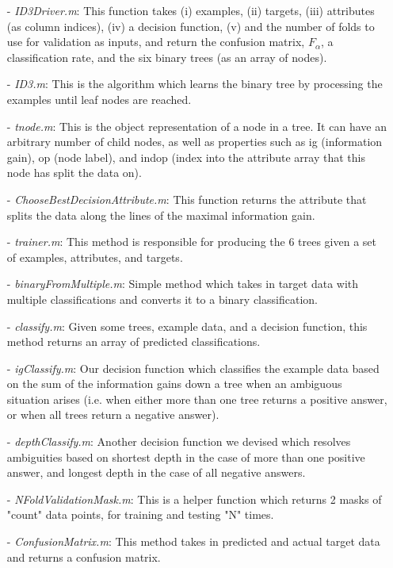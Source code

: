 \documentclass[11pt]{amsart}
\begin{document}
\begin{itemize}
\item[-] \emph{ID3Driver.m}: This function takes (i) examples, (ii) targets, (iii) attributes (as column indices), (iv) a decision function, (v) and the number of folds to use for validation as inputs, and return the confusion matrix, $F_{\alpha}$, a classification rate, and the six binary trees (as an array of nodes).
\item[-] \emph{ID3.m}: This is the algorithm which learns the binary tree by processing the examples until leaf nodes are reached.
\item[-] \emph{tnode.m}: This is the object representation of a node in a tree.  It can have an arbitrary number of child nodes, as well as properties such as ig (information gain), op (node label), and indop (index into the attribute array that this node has split the data on).
\item[-] \emph{ChooseBestDecisionAttribute.m}: This function returns the attribute that splits the data along the lines of the maximal information gain.
\item[-] \emph{trainer.m}: This method is responsible for producing the 6 trees given a set of examples, attributes, and targets.
\item[-] \emph{binaryFromMultiple.m}: Simple method which takes in target data with multiple classifications and converts it to a binary classification.
\item[-] \emph{classify.m}: Given some trees, example data, and a decision function, this method returns an array of predicted classifications.
\item[-] \emph{igClassify.m}: Our decision function which classifies the example data based on the sum of the information gains down a tree when an ambiguous situation arises (i.e. when either more than one tree returns a positive answer, or when all trees return a negative answer).
\item[-] \emph{depthClassify.m}: Another decision function we devised which resolves ambiguities based on shortest depth in the case of more than one positive answer, and longest depth in the case of all negative answers.
\item[-] \emph{NFoldValidationMask.m}: This is a helper function which returns 2 masks of "count" data points, for training and testing "N" times.
\item[-] \emph{ConfusionMatrix.m}: This method takes in predicted and actual target data and returns a confusion matrix.
\end{itemize}
\end{document}
